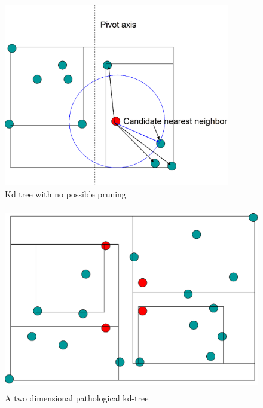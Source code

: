 \documentclass[12pt,letterpaper,doublespaced,ETD,dvips,proposal]{gtthesis}
\begin{document}
\begin{Body}
\begin{figure}[!htb]
\label{nearest_neighbor_searchon_kd_no_prune}
\centerline{\includegraphics[height=8cm]{nearest_neighbor_searchon_kd_no_prune.eps}}
\caption{Kd tree with no possible pruning}
\end{figure}


\begin{figure}[!htb]
\label{kd_pathological_points}
\centerline{\includegraphics[height=8cm]{kd_pathological_points.eps}}
\caption{A two dimensional pathological kd-tree}
\end{figure}



\end{Body}
\end{document}
